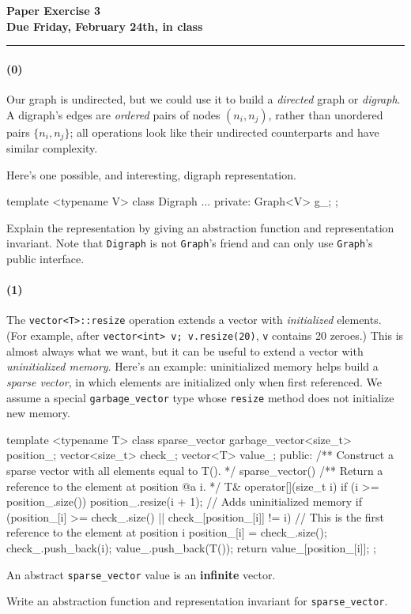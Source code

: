 \documentclass[12pt,letterpaper,twoside]{article}
\begin{document}
{\centering \textbf{Paper Exercise 3\\ Due Friday, February 24th, in class \\}}
\vspace*{-8pt}\noindent\rule{\linewidth}{1pt}

\paragraph{(0)} Our graph is undirected, but we could use it to build a
\emph{directed} graph or \emph{digraph}. A digraph's edges are \emph{ordered}
pairs of nodes $(n_i, n_j)$, rather than unordered pairs $\{n_i, n_j\}$; all
operations look like their undirected counterparts and have similar complexity.

Here's one possible, and interesting, digraph representation.
\begin{cpp}
template <typename V> 
class Digraph { 
  ... 
 private:
  Graph<V> g_;
};
\end{cpp}
Explain the representation by giving an abstraction function and representation invariant. Note that \texttt{Digraph} is not \texttt{Graph}'s friend and can only use \texttt{Graph}'s public interface.


\paragraph{(1)} The \texttt{vector<T>::resize} operation extends a vector with
\emph{initialized} elements. (For example, after \texttt{vector<int> v;
  v.resize(20)}, \texttt{v} contains 20 zeroes.) This is almost always what we
want, but it can be useful to extend a vector with \emph{uninitialized
  memory}. Here's an example: uninitialized memory helps build a \emph{sparse
  vector}, in which elements are initialized only when first referenced. We
assume a special \texttt{garbage\_vector} type whose \texttt{resize} method does
not initialize new memory.

\begin{cpp}
template <typename T> 
class sparse_vector {
  garbage_vector<size_t> position_;
  vector<size_t> check_;
  vector<T> value_;
 public:
  /** Construct a sparse vector with all elements equal to T(). */
  sparse_vector() {
  }
  /** Return a reference to the element at position @a i. */
  T& operator[](size_t i) {
    if (i >= position_.size())
      position_.resize(i + 1);   // Adds uninitialized memory
    if (position_[i] >= check_.size() || check_[position_[i]] != i) {
      // This is the first reference to the element at position i
      position_[i] = check_.size();
      check_.push_back(i);
      value_.push_back(T());
    }
    return value_[position_[i]];
  }
};
\end{cpp}

An abstract \texttt{sparse\_vector} value is an \textbf{infinite} vector.

Write an abstraction function and representation invariant for
\texttt{sparse\_vector}.
\end{document}
